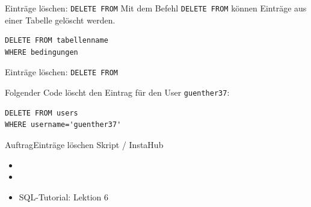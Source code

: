 \begin{frame}[fragile]{Einträge löschen: \texorpdfstring{\lstinline|DELETE FROM|}{DELETE FROM}}
Mit dem Befehl \lstinline|DELETE FROM| können Einträge aus einer Tabelle gelöscht werden.
\begin{lstlisting}
DELETE FROM tabellenname
WHERE bedingungen
\end{lstlisting}

\end{frame}

\begin{frame}[fragile]{Einträge löschen: \texorpdfstring{\lstinline|DELETE FROM|}{DELETE FROM}}

Folgender Code löscht den Eintrag für den User \texttt{guenther37}:
\begin{lstlisting}
DELETE FROM users
WHERE username='guenther37'
\end{lstlisting}
\end{frame}


\begin{frame}{Auftrag}{Einträge löschen}
Skript / InstaHub
\begin{itemize}
	\item {}
	\item {}
	\item SQL-Tutorial: Lektion 6
\end{itemize}
\end{frame}
